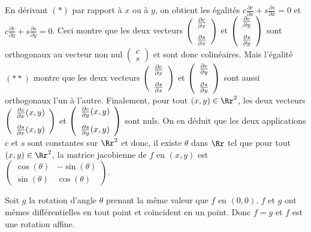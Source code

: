 {{En dérivant $(*)$ par rapport à $x$ ou à $y$, on obtient les égalités $c \frac{\partial c}{\partial x}+s \frac{\partial s}{\partial x}=0$ et $c \frac{\partial c}{\partial y}+s \frac{\partial s}{\partial y}=0$. Ceci montre que les deux vecteurs $\left(
\begin{array}{c}
 \frac{\partial c}{\partial x}\\
\rule{0mm}{6mm} \frac{\partial s}{\partial x}
\end{array}
\right)$ et $\left(
\begin{array}{c}
 \frac{\partial c}{\partial y}\\
\rule{0mm}{6mm} \frac{\partial s}{\partial y}
\end{array}
\right)$ sont orthogonaux au vecteur non nul $\left(
\begin{array}{c}
c\\
s
\end{array}
\right)$ et sont donc colinéaires. Mais l'égalité $(**)$ montre que les deux vecteurs $\left(
\begin{array}{c}
 \frac{\partial c}{\partial x}\\
\rule{0mm}{6mm} \frac{\partial s}{\partial x}
\end{array}
\right)$ et $\left(
\begin{array}{c}
 \frac{\partial c}{\partial y}\\
\rule{0mm}{6mm} \frac{\partial s}{\partial y}
\end{array}
\right)$ sont aussi orthogonaux l'un à l'autre. Finalement, pour tout $(x,y)\in\Rr^2$, les deux vecteurs $\left(
\begin{array}{c}
 \frac{\partial c}{\partial x}(x,y)\\
\rule{0mm}{6mm} \frac{\partial s}{\partial x}(x,y)
\end{array}
\right)$ et $\left(
\begin{array}{c}
 \frac{\partial c}{\partial y}(x,y)\\
\rule{0mm}{6mm} \frac{\partial s}{\partial y}(x,y)
\end{array}
\right)$ sont nuls. On en déduit que les deux applications $c$ et $s$ sont constantes sur $\Rr^2$ et donc, il existe $\theta$ dans $\Rr$ tel que pour tout $(x,y)\in\Rr^2$, la matrice jacobienne de $f$ en $(x,y)$ est $\left(
\begin{array}{cc}
\cos(\theta)&-\sin(\theta)\\
\sin(\theta)&\cos(\theta)
\end{array}
\right)$.

Soit $g$ la rotation d'angle $\theta$ prenant la même valeur que $f$ en $(0,0)$. $f$ et $g$ ont mêmes différentielles en tout point et coïncident en un point. Donc $f=g$ et $f$ est une rotation affine.

\begin{center}
\end{center}
}
}
